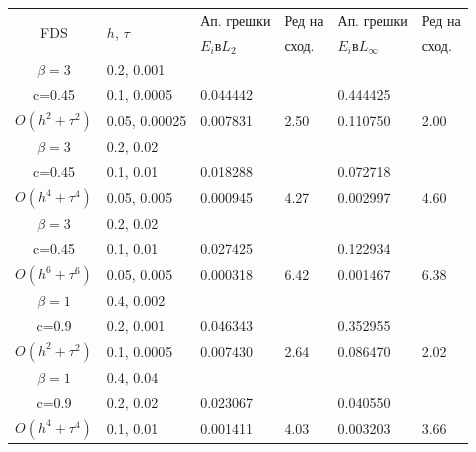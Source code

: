 \documentclass{article}
\begin{document}
\begin{table}[ht]
\centering
\small
		\begin{tabular}{||c|l|ll|ll||}
			\hline
			\hline
      \multirow{2  }{*}{FDS}        & \multirow{2  }{*}{$h$, $\tau$}  & Ап. грешки      &Ред на& Ап. грешки        &Ред на   \\
	                                        &                                                     &  $E_i$в$L_2$ &  сход. & $E_i$в$L_\infty$  & сход. \\
   			\hline 
					\hline 
  $\beta=3$                &0.2, 0.001         &              &            &                     &      \\
   c=0.45                     &0.1, 0.0005         &0.044442  &            &0.444425 &       \\
     $O(h^2 + \tau^ 2)$ &0.05, 0.00025  & 0.007831 & 2.50      & 0.110750     & 2.00      \\
			\hline 
  $\beta=3$               &0.2, 0.02       &                &            &                     &      \\
   c=0.45                    &0.1, 0.01      &0.018288 &            &0.072718   &       \\
     $O(h^4+ \tau^4)$ &0.05, 0.005  &0.000945 &4.27    &0.002997   &4.60      \\
			\hline 
  $\beta=3$               &0.2, 0.02       &                &            &                      &            \\
     c=0.45                 &0.1, 0.01        &0.027425 &            &  0.122934    &           \\
     $O(h^6+ \tau^6)$ &0.05, 0.005 &0.000318 & 6.42     & 0.001467     &6.38   \\
	   \hline
			\hline 
       $\beta=1$       &0.4, 0.002        &             &            &           &   \\
                  c=0.9    &0.2, 0.001       &  0.046343   &            &0.352955 &   \\
  $O(h^2+ \tau^2)$ &0.1, 0.0005   &0.007430   &2.64  &0.086470  & 2.02 \\
			\hline
      $\beta=1$               &0.4, 0.04    &            &               &             &    \\
       c=0.9                     &0.2, 0.02     & 0.023067   &        &  0.040550   &   \\
       $O(h^4+ \tau^4)$ &0.1, 0.01   &0.001411 & 4.03   & 0.003203  & 3.66  \\
    \hline

\end{tabular}
\end{table}
\end{document}
